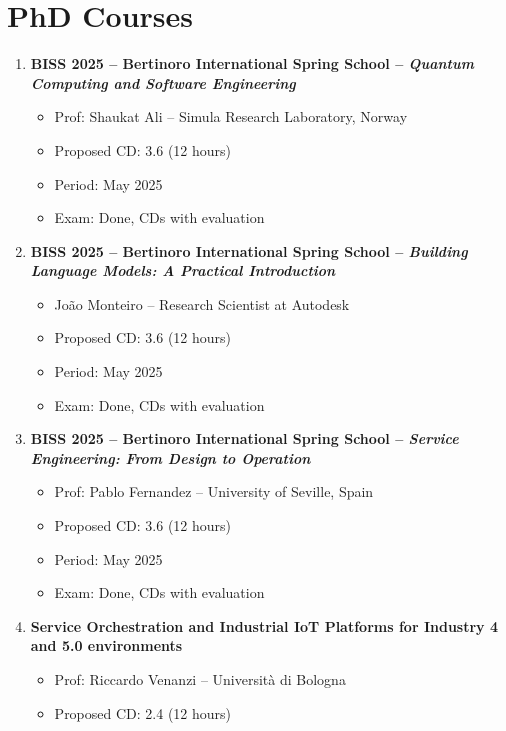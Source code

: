 \documentclass[runningheads]{llncs}
\begin{document}
    \section{PhD Courses}

    \begin{enumerate}
        \item \textbf{BISS 2025 -- Bertinoro International Spring School -- \textit{Quantum Computing and Software Engineering}}
        \begin{itemize}
            \item Prof: Shaukat Ali -- Simula Research Laboratory, Norway
            \item Proposed CD: 3.6 (12 hours)
            \item Period: May 2025
            \item Exam: Done, CDs with evaluation
        \end{itemize}
        \item \textbf{BISS 2025 -- Bertinoro International Spring School -- \textit{Building Language Models: A Practical Introduction}}
        \begin{itemize}
            \item João Monteiro -- Research Scientist at Autodesk
            \item Proposed CD: 3.6 (12 hours)
            \item Period: May 2025
            \item Exam: Done, CDs with evaluation
        \end{itemize}
        \item \textbf{BISS 2025 -- Bertinoro International Spring School -- \textit{Service Engineering: From Design to Operation}}
        \begin{itemize}
            \item Prof: Pablo Fernandez -- University of Seville, Spain
            \item Proposed CD: 3.6 (12 hours)
            \item Period: May 2025
            \item Exam: Done, CDs with evaluation
        \end{itemize}
        \item \textbf{Service Orchestration and Industrial IoT Platforms for Industry 4 and 5.0 environments}
        \begin{itemize}
            \item Prof: Riccardo Venanzi -- Università di Bologna
            \item Proposed CD: 2.4 (12 hours)

\end{itemize}
\end{enumerate}
\end{document}
